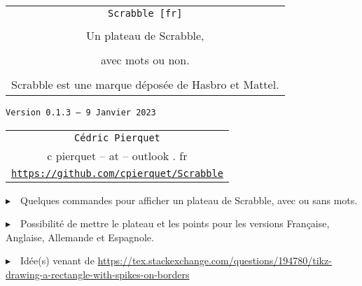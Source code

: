 \documentclass{article}
\def\TPversion{0.1.3}
\def\TPdate{9 Janvier 2023}
\begin{document}
\pagestyle{fancy}

\thispagestyle{empty}

\vspace{2cm}

\begin{center}
	\begin{minipage}{0.75\linewidth}
	\begin{tcolorbox}[colframe=yellow,colback=yellow!15]
		\begin{center}
			\begin{tabular}{c}
				{\Huge \texttt{Scrabble [fr]}}\\
				\\
				{\LARGE Un plateau de Scrabble,} \\
				\\
				{\LARGE avec mots ou non.} \\
				\\
				{Scrabble\texttrademark{} est une marque déposée de Hasbro\texttrademark{} et Mattel\texttrademark{}.}
			\end{tabular}
			
			\medskip
			
			{\small \texttt{Version \TPversion{} -- \TPdate}}
		\end{center}
	\end{tcolorbox}
\end{minipage}
\end{center}

\vspace{0.5cm}

\begin{center}
	\begin{tabular}{c}
	\texttt{Cédric Pierquet}\\
	{\ttfamily c pierquet -- at -- outlook . fr}\\
	\texttt{\url{https://github.com/cpierquet/Scrabble}}
\end{tabular}
\end{center}

\vspace{0.5cm}

{$\blacktriangleright$~~Quelques commandes pour afficher un plateau de Scrabble, avec ou sans mots.}

\smallskip

{$\blacktriangleright$~~Possibilité de mettre le plateau et les points pour les versions Française, Anglaise, Allemande et Espagnole.}

\smallskip

{$\blacktriangleright$~~Idée(s) venant de \url{https://tex.stackexchange.com/questions/194780/tikz-drawing-a-rectangle-with-spikes-on-borders}}
\end{document}
